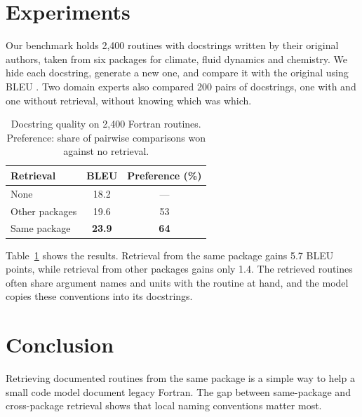 \documentclass{article}
\begin{document}
\section{Experiments}
\label{sec:experiments}

Our benchmark holds 2,400 routines with docstrings written by their original authors, taken from six packages for climate, fluid dynamics and chemistry.
We hide each docstring, generate a new one, and compare it with the original using BLEU \citep{papineni2002bleu}.
Two domain experts also compared 200 pairs of docstrings, one with and one without retrieval, without knowing which was which.

\begin{table}[t]
\caption{Docstring quality on 2,400 Fortran routines. Preference: share of pairwise comparisons won against no retrieval.}
\label{tab:results}
\centering
\begin{tabular}{lcc}
\toprule
Retrieval & BLEU & Preference (\%) \\
\midrule
None & 18.2 & --- \\
Other packages & 19.6 & 53 \\
Same package & \textbf{23.9} & \textbf{64} \\
\bottomrule
\end{tabular}
\end{table}

Table~\ref{tab:results} shows the results.
Retrieval from the same package gains 5.7 BLEU points, while retrieval from other packages gains only 1.4.
The retrieved routines often share argument names and units with the routine at hand, and the model copies these conventions into its docstrings.

\section{Conclusion}
\label{sec:conclusion}

Retrieving documented routines from the same package is a simple way to help a small code model document legacy Fortran.
The gap between same-package and cross-package retrieval shows that local naming conventions matter most.



\end{document}

